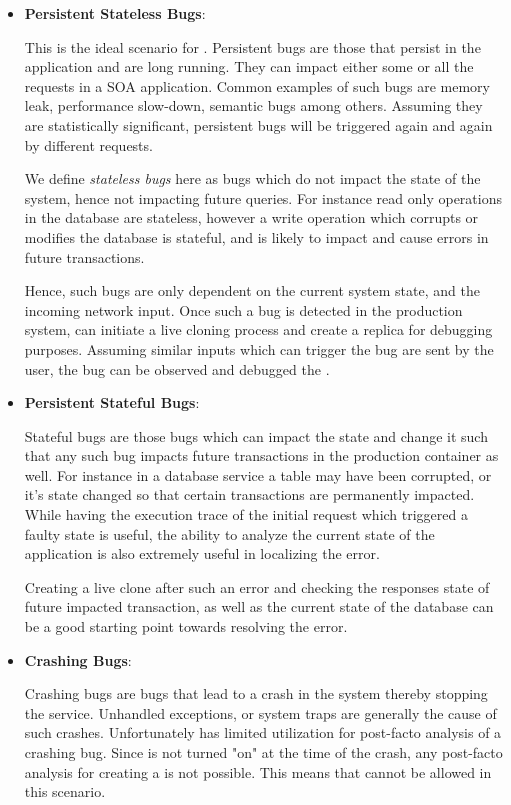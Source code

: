 \begin{itemize}

	\item \textbf{Persistent Stateless Bugs}: 
	
	This is the ideal scenario for \parikshan.
	Persistent bugs are those that persist in the application and are long running. 
	They can impact either some or all the requests in a SOA application.
	Common examples of such bugs are memory leak, performance slow-down, semantic bugs among others.
	Assuming they are statistically significant, persistent bugs will be triggered again and again by different requests.
	
	We define \emph{stateless bugs} here as bugs which do not impact the state of the system, hence not impacting future queries. 
	For instance read only operations in the database are stateless, however a write operation which corrupts or modifies the database is stateful, and is likely to impact and cause errors in future transactions.
	
	Hence, such bugs are only dependent on the current system state, and the incoming network input.
	Once such a bug is detected in the production system, \parikshan can initiate a live cloning process and create a replica for debugging purposes. 
	Assuming similar inputs which can trigger the bug are sent by the user, the bug can be observed and debugged the \debugcontainer.
	
	\item \textbf{Persistent Stateful Bugs}:
	
	Stateful bugs are those bugs which can impact the state and change it such that any such bug impacts future transactions in the production container as well.
	For instance in a database service a table may have been corrupted, or it's state changed so that certain transactions are permanently impacted. 
	While having the execution trace of the initial request which triggered a faulty state is useful, the ability to analyze the current state of the application is also extremely useful in localizing the error.
	
	Creating a live clone after such an error and checking the responses state of future impacted transaction, as well as the current state of the database can be a good starting point towards resolving the error. 
	
	\item \textbf{Crashing Bugs}: 
	
	Crashing bugs are bugs that lead to a crash in the system thereby stopping the service.
	Unhandled exceptions, or system traps are generally the cause of such crashes.
	Unfortunately \parikshan has limited utilization for post-facto analysis of a crashing bug. 
	Since \parikshan is not turned "on" at the time of the crash, any post-facto analysis for creating a \debugcontainer is not possible.
	This means that \parikshan cannot be allowed in this scenario.
	
\end{itemize} 

